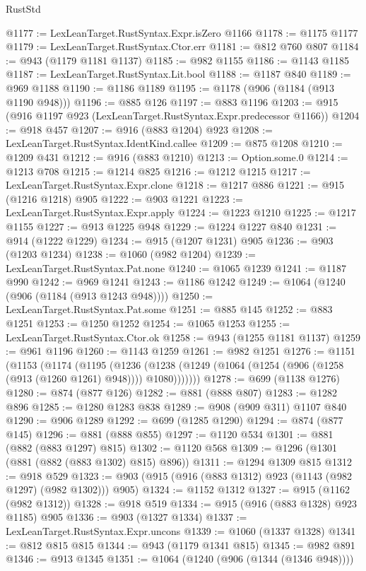 \begin{lexlean}{RustStd}
\begin{coremodule}
@1177 := LexLeanTarget.RustSyntax.Expr.isZero @1166
@1178 := @1175 @1177
@1179 := LexLeanTarget.RustSyntax.Ctor.err
@1181 := @812 @760 @807
@1184 := @943 (@1179 @1181 @1137)
@1185 := @982 @1155
@1186 := @1143 @1185
@1187 := LexLeanTarget.RustSyntax.Lit.bool
@1188 := @1187 @840
@1189 := @969 @1188
@1190 := @1186 @1189
@1195 := @1178 (@906 (@1184 (@913 @1190 @948)))
@1196 := @885 @126
@1197 := @883 @1196
@1203 := @915 (@916 @1197 @923 (LexLeanTarget.RustSyntax.Expr.predecessor @1166))
@1204 := @918 @457
@1207 := @916 (@883 @1204) @923
@1208 := LexLeanTarget.RustSyntax.IdentKind.callee
@1209 := @875 @1208
@1210 := @1209 @431
@1212 := @916 (@883 @1210)
@1213 := Option.some.{0}
@1214 := @1213 @708
@1215 := @1214 @825
@1216 := @1212 @1215
@1217 := LexLeanTarget.RustSyntax.Expr.clone
@1218 := @1217 @886
@1221 := @915 (@1216 @1218) @905
@1222 := @903 @1221
@1223 := LexLeanTarget.RustSyntax.Expr.apply
@1224 := @1223 @1210
@1225 := @1217 @1155
@1227 := @913 @1225 @948
@1229 := @1224 @1227 @840
@1231 := @914 (@1222 @1229)
@1234 := @915 (@1207 @1231) @905
@1236 := @903 (@1203 @1234)
@1238 := @1060 (@982 @1204)
@1239 := LexLeanTarget.RustSyntax.Pat.none
@1240 := @1065 @1239
@1241 := @1187 @990
@1242 := @969 @1241
@1243 := @1186 @1242
@1249 := @1064 (@1240 (@906 (@1184 (@913 @1243 @948))))
@1250 := LexLeanTarget.RustSyntax.Pat.some
@1251 := @885 @145
@1252 := @883 @1251
@1253 := @1250 @1252
@1254 := @1065 @1253
@1255 := LexLeanTarget.RustSyntax.Ctor.ok
@1258 := @943 (@1255 @1181 @1137)
@1259 := @961 @1196
@1260 := @1143 @1259
@1261 := @982 @1251
@1276 := @1151
    (@1153
      (@1174
        (@1195
          (@1236 (@1238 (@1249 (@1064 (@1254 (@906 (@1258 (@913 (@1260 @1261) @948)))) @1080)))))))
@1278 := @699 (@1138 @1276)
@1280 := @874 (@877 @126)
@1282 := @881 (@888 @807)
@1283 := @1282 @896
@1285 := @1280 @1283 @838
@1289 := @908 (@909 @311) @1107 @840
@1290 := @906 @1289
@1292 := @699 (@1285 @1290)
@1294 := @874 (@877 @145)
@1296 := @881 (@888 @855)
@1297 := @1120 @534
@1301 := @881 (@882 (@883 @1297) @815)
@1302 := @1120 @568
@1309 := @1296 (@1301 (@881 (@882 (@883 @1302) @815) @896))
@1311 := @1294 @1309 @815
@1312 := @918 @529
@1323 := @903 (@915 (@916 (@883 @1312) @923 (@1143 (@982 @1297) (@982 @1302))) @905)
@1324 := @1152 @1312
@1327 := @915 (@1162 (@982 @1312))
@1328 := @918 @519
@1334 := @915 (@916 (@883 @1328) @923 @1185) @905
@1336 := @903 (@1327 @1334)
@1337 := LexLeanTarget.RustSyntax.Expr.uncons
@1339 := @1060 (@1337 @1328)
@1341 := @812 @815 @815
@1344 := @943 (@1179 @1341 @815)
@1345 := @982 @891
@1346 := @913 @1345
@1351 := @1064 (@1240 (@906 (@1344 (@1346 @948))))

\end{coremodule}
\end{lexlean}
